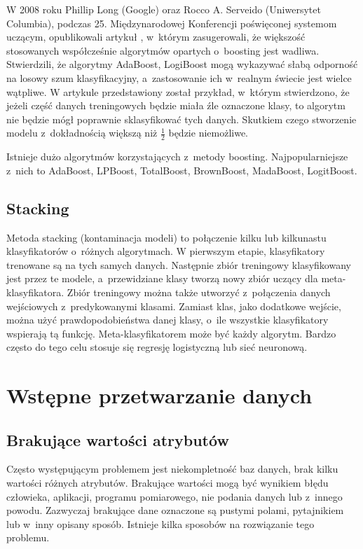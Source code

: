 W 2008 roku Phillip Long (Google) oraz Rocco A. Serveido (Uniwersytet Columbia), podczas 25. Międzynarodowej Konferencji poświęconej systemom uczącym, opublikowali artykuł \cite{boosting}, w którym zasugerowali, że większość stosowanych współcześnie algorytmów opartych o boosting jest wadliwa. Stwierdzili, że algorytmy AdaBoost, LogiBoost mogą wykazywać słabą odporność na losowy szum klasyfikacyjny, a zastosowanie ich w realnym świecie jest wielce wątpliwe. W artykule przedstawiony został przykład, w którym stwierdzono, że jeżeli część danych treningowych będzie miała źle oznaczone klasy, to algorytm nie będzie mógł poprawnie sklasyfikować tych danych. Skutkiem czego stworzenie modelu z dokładnością większą niż $\frac{1}{2}$ będzie niemożliwe. \par
Istnieje dużo algorytmów korzystających z~metody boosting. Najpopularniejsze z nich to AdaBoost, LPBoost, TotalBoost, BrownBoost, MadaBoost, LogitBoost.
\subsection{Stacking}
Metoda stacking (kontaminacja modeli) \cite{stackingc} to połączenie kilku lub kilkunastu klasyfikatorów o~różnych algorytmach. W pierwszym etapie, klasyfikatory trenowane są na tych samych danych. Następnie zbiór treningowy klasyfikowany jest przez te modele, a~przewidziane klasy tworzą nowy zbiór uczący dla meta-klasyfikatora. Zbiór treningowy można także utworzyć z~połączenia danych wejściowych z~predykowanymi klasami. Zamiast klas, jako dodatkowe wejście, można użyć prawdopodobieństwa danej klasy, o~ile wszystkie klasyfikatory wspierają tą funkcję. Meta-klasyfikatorem może być każdy algorytm. Bardzo często do tego celu stosuje się regresję logistyczną lub sieć neuronową. 
\section{Wstępne przetwarzanie danych}
\subsection{Brakujące wartości atrybutów}
Często występującym problemem jest niekompletność baz danych, brak kilku wartości różnych atrybutów. Brakujące wartości mogą być wynikiem błędu człowieka, aplikacji, programu pomiarowego, nie podania danych lub z~innego powodu. Zazwyczaj brakujące dane oznaczone są pustymi polami, pytajnikiem lub w~inny opisany sposób. Istnieje kilka sposobów na rozwiązanie tego problemu.
